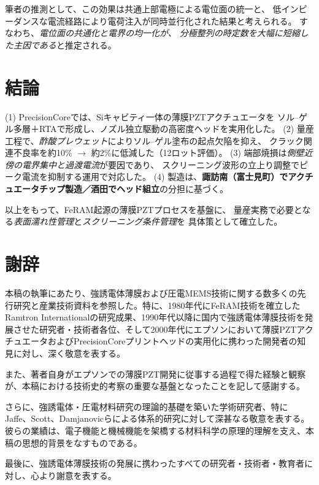 \documentclass[conference]{IEEEtran}
\begin{document}
筆者の推測として、この効果は共通上部電極による電位面の統一と、
低インピーダンスな電流経路により電荷注入が同時並行化された結果と考えられる。
すなわち、\emph{電位面の共通化と電界の均一化が、
分極整列の時定数を大幅に短縮した主因である}と推定される。

\section{結論}
(1) PrecisionCoreでは、Siキャビティ一体の薄膜PZTアクチュエータを
ソル–ゲル多層＋RTAで形成し、ノズル独立駆動の高密度ヘッドを実用化した\cite{uemura2014mems}。
(2) 量産工程で、\emph{酢酸プレウェット}によりソル–ゲル塗布の起点欠陥を抑え、
クラック関連不良率を約10\% $\rightarrow$ 約2\%に低減した（12ロット評価）。
(3) 端部焼損は\emph{側壁近傍の電界集中と過渡電流}が要因であり、
スクリーニング波形の立上り調整でピーク電流を抑制する運用で対応した。
(4) 製造は、\textbf{諏訪南（富士見町）でアクチュエータチップ製造／酒田でヘッド組立}の分担に基づく。

以上をもって、FeRAM起源の薄膜PZTプロセスを基盤に、
量産実務で必要となる\emph{表面濡れ性管理}と\emph{スクリーニング条件管理}を
具体策として確立した。

\section*{謝辞}
本稿の執筆にあたり、強誘電体薄膜および圧電MEMS技術に関する数多くの先行研究と産業技術資料を参照した。特に、1980年代にFeRAM技術を確立したRamtron Internationalの研究成果、1990年代以降に国内で強誘電体薄膜技術を発展させた研究者・技術者各位、そして2000年代にエプソンにおいて薄膜PZTアクチュエータおよびPrecisionCoreプリントヘッドの実用化に携わった開発者の知見に対し、深く敬意を表する。

また、著者自身がエプソンでの薄膜PZT開発に従事する過程で得た経験と観察が、本稿における技術史的考察の重要な基盤となったことを記して感謝する。

さらに、強誘電体・圧電材料研究の理論的基礎を築いた学術研究者、特にJaffe、Scott、Damjanovicらによる体系的研究に対して深甚なる敬意を表する。彼らの業績は、電子機能と機械機能を架橋する材料科学の原理的理解を支え、本稿の思想的背景をなすものである。

最後に、強誘電体薄膜技術の発展に携わったすべての研究者・技術者・教育者に対し、心より謝意を表する。
\end{document}
